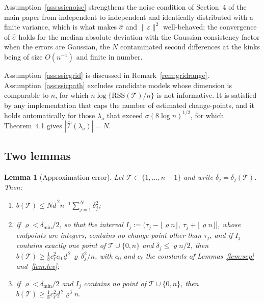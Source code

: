 \documentclass[12pt, a4paper]{article}
\newtheorem{lemma}{Lemma}[section]
\newcommand{\mainthm}{Theorem~4.1}
\begin{document}
Assumption~\ref{ass:ssicnoise} strengthens the noise condition of Section~4 of
the main paper from independent to independent and identically distributed with
a finite variance, which is what makes $\hat\sigma$ and $\|\varepsilon\|^2$
well-behaved; the convergence of $\hat\sigma$ holds for the median absolute deviation
with the Gaussian consistency factor when the errors are Gaussian, the $N$
contaminated second differences at the kinks being of size $O(n^{-1})$ and
finite in number.

Assumption~\ref{ass:ssicgrid} is discussed in Remark~\ref{rem:gridrange}.
Assumption~\ref{ass:ssicpath} excludes candidate models whose dimension is
comparable to $n$, for which $n\log\{\mathrm{RSS}(\mathcal{T})/n\}$ is not
informative. It is satisfied by any implementation that caps the number of
estimated change-points, and it holds automatically for those $\lambda_a$ that
exceed $\sigma(8\log n)^{1/2}$, for which \mainthm{} gives
$|\hat{\mathcal{T}}(\lambda_a)| = N$.

\subsection{Two lemmas}
\label{sup:ssiclem}

\begin{lemma}[Approximation error]
\label{lem:approx}
Let $\mathcal{T} \subset \{1,\ldots,n-1\}$ and write $\delta_j =
\delta_j(\mathcal{T})$. Then:
\begin{enumerate}
\item[\emph{(a)}] $b(\mathcal{T}) \le N \bar d^{\,2} n^{-1}
\sum_{j=1}^N \delta_j^2$;
\item[\emph{(b)}] if $\varrho < \delta_{\min}/2$, so that the interval $I_j := (\tau_j - \lfloor\varrho n\rfloor,\ \tau_j + \lfloor\varrho n\rfloor]$, whose endpoints are integers, contains no change-point other than $\tau_j$, and if $I_j$ contains exactly one point of $\mathcal{T} \cup \{0,n\}$ and $\delta_j \le \varrho n / 2$, then
$b(\mathcal{T}) \ge \tfrac18 c_\ell^2 c_0\, \underline d^{\,2}\, \varrho\, \delta_j^2 / n$, with $c_0$ and $c_\ell$ the constants of Lemmas~\ref{lem:sep} and~\ref{lem:lev};
\item[\emph{(c)}] if $\varrho < \delta_{\min}/2$ and $I_j$ contains no point of $\mathcal{T} \cup \{0,n\}$, then $b(\mathcal{T}) \ge \tfrac18 c_\ell^2 \underline d^{\,2} \varrho^3 n$.
\end{enumerate}
\end{lemma}
\end{document}
